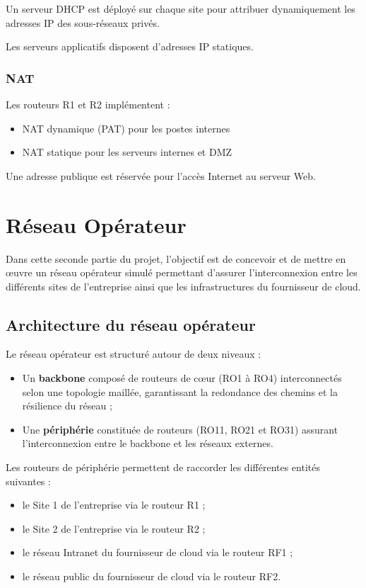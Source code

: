\documentclass[11pt,a4paper]{memoir}%
\begin{document}
		Un serveur DHCP est déployé sur chaque site pour attribuer dynamiquement les adresses IP des sous-réseaux privés.
	
		Les serveurs applicatifs disposent d’adresses IP statiques.
	
	\subsection{NAT}
	
	Les routeurs R1 et R2 implémentent :
	
	\begin{itemize}
		\item NAT dynamique (PAT) pour les postes internes
		\item NAT statique pour les serveurs internes et DMZ
	\end{itemize}	
	Une adresse publique est réservée pour l’accès Internet au serveur Web.	
	
\chapter{Réseau Opérateur}
Dans cette seconde partie du projet, l’objectif est de concevoir et de mettre en œuvre un réseau opérateur simulé permettant d’assurer l’interconnexion entre les différents sites de l’entreprise ainsi que les infrastructures du fournisseur de cloud.

\section{Architecture du réseau opérateur}

Le réseau opérateur est structuré autour de deux niveaux :

\begin{itemize}
	\item Un \textbf{backbone} composé de routeurs de cœur (RO1 à RO4) interconnectés selon une topologie maillée, garantissant la redondance des chemins et la résilience du réseau ;
	
	\item Une \textbf{périphérie} constituée de routeurs (RO11, RO21 et RO31) assurant l’interconnexion entre le backbone et les réseaux externes.
\end{itemize}

Les routeurs de périphérie permettent de raccorder les différentes entités suivantes :

\begin{itemize}
	\item le Site 1 de l’entreprise via le routeur R1 ;
	\item le Site 2 de l’entreprise via le routeur R2 ;
	\item le réseau Intranet du fournisseur de cloud via le routeur RF1 ;
	\item le réseau public du fournisseur de cloud via le routeur RF2.
\end{itemize}
\end{document}
